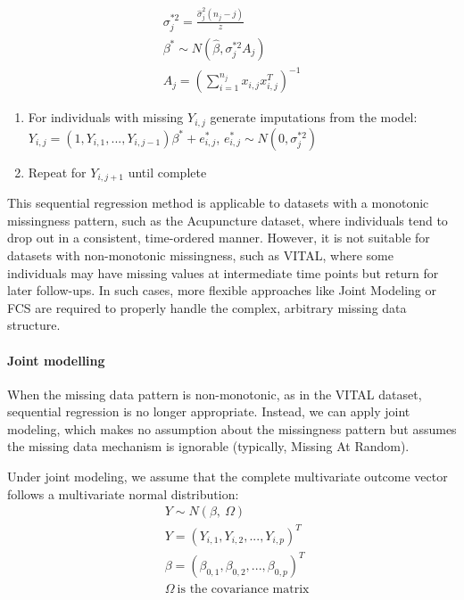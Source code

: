 \documentclass{article}
\begin{document}
\begin{align*}
   \sigma_j^{*2} = \frac{\hat{\sigma}_j^2 (n_j - j)}{z} \\
   \beta^* \sim N(\hat{\beta}, \sigma_j^{*2} A_j) \\
   A_j = (\sum_{i=1}^{n_j} x_{i,j} x_{i,j}^T)^{-1}
   \end{align*}

\begin{enumerate}
\def\labelenumi{\arabic{enumi}.}
\setcounter{enumi}{3}
\item
  For individuals with missing \(Y_{i,j}\) generate imputations from the
  model:
  \(Y_{i,j} = (1,Y_{i,1},...,Y_{i,j-1}) \beta^{*} + e^{*}_{i,j}\),
  \(e_{i,j}^{*} \sim{N} (0,\sigma^{*2}_{j})\)
\item
  Repeat for \(Y_{i,j+1}\) until complete
\end{enumerate}

This sequential regression method is applicable to datasets with a
monotonic missingness pattern, such as the Acupuncture dataset, where
individuals tend to drop out in a consistent, time-ordered manner.
However, it is not suitable for datasets with non-monotonic missingness,
such as VITAL, where some individuals may have missing values at
intermediate time points but return for later follow-ups. In such cases,
more flexible approaches like Joint Modeling or FCS are required to
properly handle the complex, arbitrary missing data structure.

\paragraph{Joint modelling}\label{joint-modelling}

When the missing data pattern is non-monotonic, as in the VITAL dataset,
sequential regression is no longer appropriate. Instead, we can apply
joint modeling, which makes no assumption about the missingness pattern
but assumes the missing data mechanism is ignorable (typically, Missing
At Random).

Under joint modeling, we assume that the complete multivariate outcome
vector follows a multivariate normal distribution: \begin{align*}
    & Y \sim N(\beta,\ \Omega) \\
    & Y = (Y_{i,1},Y_{i,2},...,Y_{i,p})^{T} \\
    & \beta = (\beta_{0,1},\beta_{0,2},...,\beta_{0,p})^{T} \\
    & \Omega \ \text{is the covariance matrix}
    \end{align*}
\end{document}
